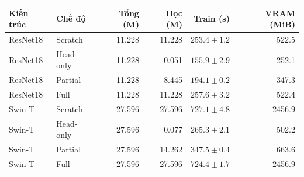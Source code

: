 \begin{tabular}{llrrrr}
\toprule
Kiến trúc & Chế độ & Tổng (M) & Học (M) & Train (s) & VRAM (MiB) \\
\midrule
ResNet18 & Scratch & 11.228 & 11.228 & $253.4 \pm 1.2$ & 522.5 \\
ResNet18 & Head-only & 11.228 & 0.051 & $155.9 \pm 2.9$ & 252.1 \\
ResNet18 & Partial & 11.228 & 8.445 & $194.1 \pm 0.2$ & 347.3 \\
ResNet18 & Full & 11.228 & 11.228 & $257.6 \pm 3.2$ & 522.4 \\
Swin-T & Scratch & 27.596 & 27.596 & $727.1 \pm 4.8$ & 2456.9 \\
Swin-T & Head-only & 27.596 & 0.077 & $265.3 \pm 2.1$ & 502.2 \\
Swin-T & Partial & 27.596 & 14.262 & $347.5 \pm 0.4$ & 663.6 \\
Swin-T & Full & 27.596 & 27.596 & $724.4 \pm 1.7$ & 2456.9 \\
\bottomrule
\end{tabular}
